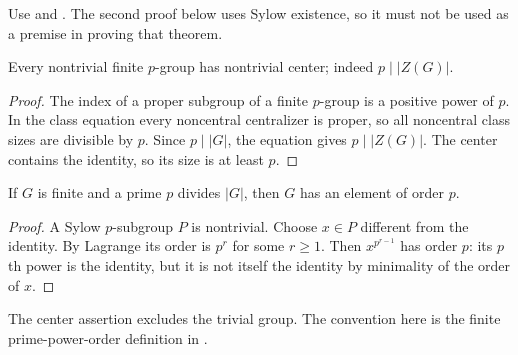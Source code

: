Use  and
. The second proof below uses Sylow
existence, so it must not be used as a premise in proving that theorem.

\begin{theorem}\label{p-group-center}
Every nontrivial finite $p$-group has nontrivial center; indeed
$p\mid|Z(G)|$.
\end{theorem}
\begin{proof}\label{p-group-center-proof}
The index of a proper subgroup of a finite $p$-group is a positive
power of $p$. In the class equation every noncentral centralizer is
proper, so all noncentral class sizes are divisible by $p$.
Since $p\mid|G|$, the equation gives $p\mid|Z(G)|$. The center contains
the identity, so its size is at least $p$.
\end{proof}
\begin{theorem}\label{cauchy-theorem}
If $G$ is finite and a prime $p$ divides $|G|$, then $G$ has an element
of order $p$.
\end{theorem}
\begin{proof}\label{cauchy-theorem-proof}
A Sylow $p$-subgroup $P$ is nontrivial. Choose $x\in P$ different
from the identity. By Lagrange its order is $p^r$ for some $r\ge1$.
Then $x^{p^{r-1}}$ has order $p$: its $p$th power is the identity,
but it is not itself the identity by minimality of the order of $x$.
\end{proof}
\begin{remark}\label{p-center-scope}
The center assertion excludes the trivial group. The convention here
is the finite prime-power-order definition in
.
\end{remark}
